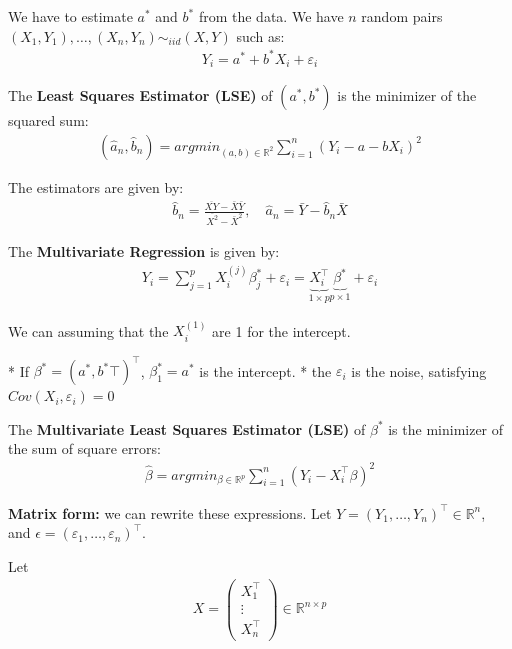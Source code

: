 We have to estimate $a^{*}$ and $b^{*}$ from the data. We have $n$ random pairs $(X_1, Y_1), \ldots, (X_n, Y_n) \sim_{iid} (X, Y)$ such as:
\begin{align*}
Y_i = a^{*} + b^{*} X_i + \varepsilon_i
\end{align*}

The \textbf{Least Squares Estimator (LSE)} of $(a^{*}, b^{*})$ is the minimizer of the squared sum:
\begin{align*}
(\hat{a}_n, \hat{b}_n) = argmin_{(a, b) \in \mathbb{R}^2}\sum_{i=1}^n(Y_i - a - bX_i)^2
\end{align*}

The estimators are given by:
\begin{align*}
\hat{b}_n = \frac{\overline{XY} - \bar{X}\bar{Y}}{\overline{X^2} - \bar{X}^2}, \quad \hat{a}_n = \bar{Y} - \hat{b}_n \bar{X}
\end{align*}

The \textbf{Multivariate Regression} is given by:
\begin{align*}
Y_i = \sum_{j=1}^pX_i^{(j)}\beta_j^{*} + \varepsilon_i= \underbrace{X_i^\top}_{1 \times p}\underbrace{\beta^{*}}_{p \times 1} + \varepsilon_i
\end{align*}

We can assuming that the $X_i^{(1)}$ are 1 for the intercept.

* If $\beta^{*} = (a^{*}, b^{*}\top)^\top$, $\beta_1^{*} = a^{*}$ is the intercept.
* the $\varepsilon_i$ is the noise, satisfying $Cov(X_i, \varepsilon_i) = 0$

The \textbf{Multivariate Least Squares Estimator (LSE)} of $\beta^{*}$ is the minimizer of the sum of square errors:
\begin{align*}
\hat{\beta} = argmin_{\beta \in \mathbb{R}^p}\sum_{i=1}^n(Y_i - X_i^\top\beta)^2
\end{align*}

\textbf{Matrix form:} we can rewrite these expressions. Let $Y = (Y_1, \ldots, Y_n)^\top \in \mathbb{R}^n$, and $\epsilon = (\varepsilon_1, \ldots, \varepsilon_n)^\top$. 

Let
\begin{align*}
X = \begin{pmatrix} X_1^\top \\ \vdots \\ X_n^\top \end{pmatrix} \in \mathbb{R}^{n \times p}
\end{align*}

